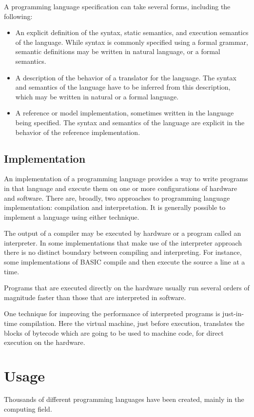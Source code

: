 A programming language specification can take several forms, including the
following:
\begin{itemize}
  \item An explicit definition of the syntax, static semantics, and execution
    semantics of the language. While syntax is commonly specified using a
    formal grammar, semantic definitions may be written in natural language,
    or a formal seman\-tics.
  \item A description of the behavior of a translator for the language.
    The syntax and semantics of the language have to be inferred from this
    description, which may be written in natural or a formal language.
  \item A reference or model implementation, sometimes written in the language
    being specified. The syntax and semantics of the language are explicit in
    the behavior of the reference implementation.
\end{itemize}

\section{Implementation}
An implementation of a programming language provides a way to write
prog\-rams in that language and execute them on one or more configurations of
hardware and software. There are, broadly, two approaches to programming
language imple\-mentation: compilation and interpretation. It is generally
possible to implement a lan\-guage using either technique.

The output of a compiler may be executed by hardware or a program called an
interpreter. In some implementations that make use of the interpreter
approach there is no distinct boundary between compiling and interpreting.
For instance, some implementations of BASIC compile and then execute the
source a line at a time.

Programs that are executed directly on the hardware usually run several
orders of magnitude faster than those that are interpreted in software.

One technique for improving the performance of interpreted programs is
just-in-time compilation. Here the virtual machine, just before execution,
translates the blocks of bytecode which are going to be used to machine
code, for direct execution on the hardware.

\chapter{Usage}
Thousands of different programming languages have been created, mainly in
the computing field.

